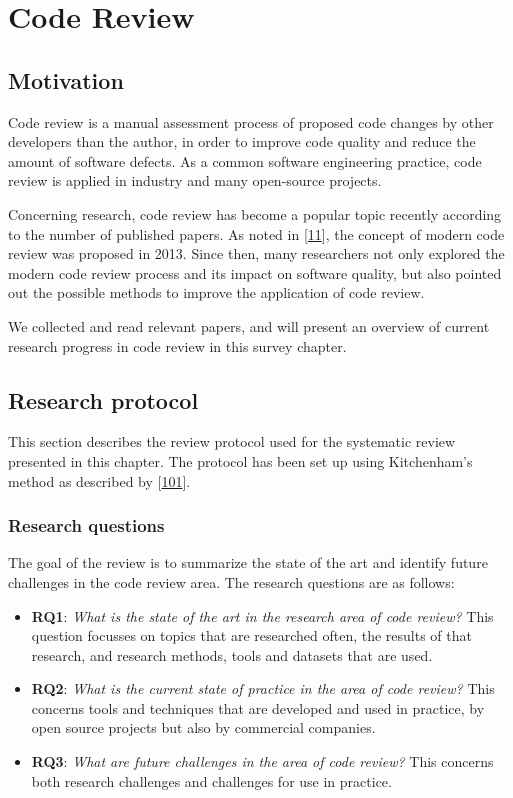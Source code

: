 \documentclass[]{book}
\providecommand{\tightlist}{%
  \setlength{\itemsep}{0pt}\setlength{\parskip}{0pt}}
\begin{document}
\chapter{Code Review}\label{code-review}

\section{Motivation}\label{motivation-5}

Code review is a manual assessment process of proposed code changes by
other developers than the author, in order to improve code quality and
reduce the amount of software defects. As a common software engineering
practice, code review is applied in industry and many open-source
projects.

Concerning research, code review has become a popular topic recently
according to the number of published papers. As noted in
{[}\protect\hyperlink{ref-bacchelli2013expectations}{11}{]}, the concept
of modern code review was proposed in 2013. Since then, many researchers
not only explored the modern code review process and its impact on
software quality, but also pointed out the possible methods to improve
the application of code review.

We collected and read relevant papers, and will present an overview of
current research progress in code review in this survey chapter.

\section{Research protocol}\label{research-protocol-4}

This section describes the review protocol used for the systematic
review presented in this chapter. The protocol has been set up using
Kitchenham's method as described by
{[}\protect\hyperlink{ref-kitchenham2007}{101}{]}.

\subsection{Research questions}\label{research-questions-2}

The goal of the review is to summarize the state of the art and identify
future challenges in the code review area. The research questions are as
follows:

\begin{itemize}
\tightlist
\item
  \textbf{RQ1}: \emph{What is the state of the art in the research area
  of code review?} This question focusses on topics that are researched
  often, the results of that research, and research methods, tools and
  datasets that are used.
\item
  \textbf{RQ2}: \emph{What is the current state of practice in the area
  of code review?} This concerns tools and techniques that are developed
  and used in practice, by open source projects but also by commercial
  companies.
\item
  \textbf{RQ3}: \emph{What are future challenges in the area of code
  review?} This concerns both research challenges and challenges for use
  in practice.
\end{itemize}
\end{document}
